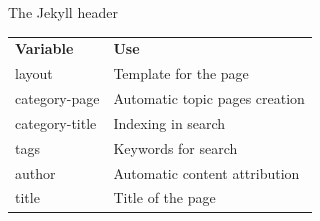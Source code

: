 \documentclass[10pt,aspectratio=169]{beamer}
\begin{document}
\begin{frame}{The Jekyll header}
\begin{table}[h]
\begin{tabular}{l l}
\textbf{Variable} & \textbf{Use} \\
layout & Template for the page\\
category-page & Automatic topic pages creation\\
category-title & Indexing in search\\
tags & Keywords for search\\
author & Automatic content attribution\\
title & Title of the page\\
\end{tabular}
\end{table}
\end{frame}


\begin{frame}[standout]
\end{frame}
\end{document}
